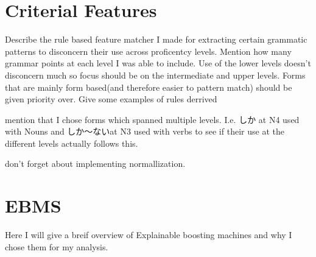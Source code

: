 \section{Criterial Features}
Describe the rule based feature matcher I made for extracting certain grammatic patterns to disconcern their use
across proficentcy levels. Mention how many grammar points at each level I was able to include. Use of the lower
levels doesn't disconcern much so focus should be on the intermediate and upper levels.  Forms that are mainly form
based(and therefore easier to pattern match) should be given priority over. Give some examples of rules derrived

mention that I chose forms which spanned multiple levels. I.e. しか at N4 used with Nouns and しか〜ないat N3 used
with verbs to see if their use at the different levels actually follows this.

don't forget about implementing normallization.

\section{EBMS}
 Here I will give a breif overview of Explainable boosting machines and why I chose them for my analysis.






